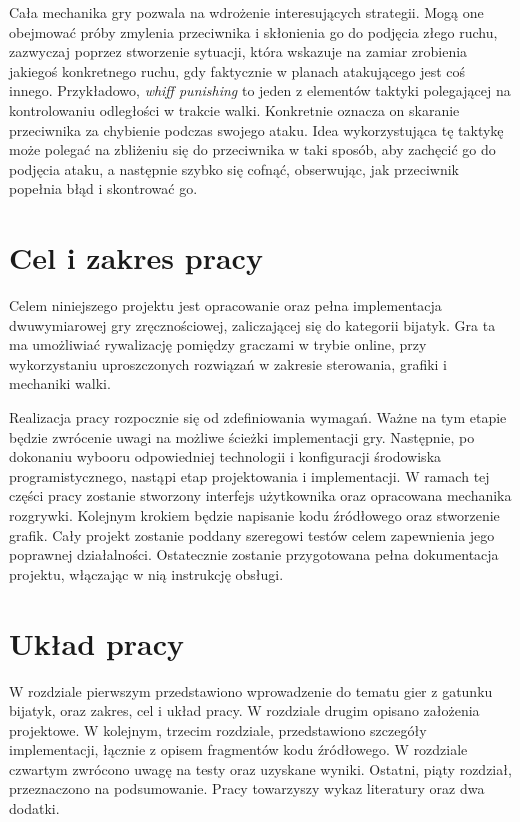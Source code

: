 Cała mechanika gry pozwala na wdrożenie interesujących strategii. Mogą one obejmować próby zmylenia przeciwnika i skłonienia go do podjęcia złego ruchu, zazwyczaj poprzez stworzenie sytuacji, która wskazuje na zamiar zrobienia jakiegoś konkretnego ruchu, gdy faktycznie w planach atakującego jest coś innego. Przykładowo, \emph{whiff punishing} to jeden z elementów taktyki polegającej na kontrolowaniu odległości w trakcie walki. Konkretnie oznacza on skaranie przeciwnika za chybienie podczas swojego ataku. Idea wykorzystująca tę taktykę może polegać na zbliżeniu się do przeciwnika w taki sposób, aby zachęcić go do podjęcia ataku, a następnie szybko się cofnąć, obserwując, jak przeciwnik popełnia błąd i skontrować go. 


\section{Cel i zakres pracy}
Celem niniejszego projektu jest opracowanie oraz pełna implementacja dwuwymiarowej gry zręcznościowej, zaliczającej się do kategorii bijatyk. Gra ta ma umożliwiać rywalizację pomiędzy graczami w trybie online, przy wykorzystaniu uproszczonych rozwiązań w zakresie sterowania, grafiki i mechaniki walki.

Realizacja pracy rozpocznie się od zdefiniowania wymagań. Ważne na tym etapie będzie zwrócenie uwagi na możliwe ścieżki implementacji gry. Następnie, po dokonaniu wybooru odpowiedniej technologii i konfiguracji środowiska programistycznego, nastąpi etap projektowania i implementacji. W ramach tej części pracy zostanie stworzony interfejs użytkownika oraz opracowana mechanika rozgrywki. Kolejnym krokiem będzie napisanie kodu źródłowego oraz stworzenie grafik. Cały projekt zostanie poddany szeregowi testów celem zapewnienia jego poprawnej działalności. Ostatecznie zostanie przygotowana pełna dokumentacja projektu, włączając w nią instrukcję obsługi.

\section{Układ pracy}
W rozdziale pierwszym przedstawiono wprowadzenie do tematu gier z gatunku bijatyk, oraz zakres, cel i układ pracy.
W rozdziale drugim opisano założenia projektowe.
W kolejnym, trzecim rozdziale, przedstawiono szczegóły implementacji, łącznie z opisem fragmentów kodu źródłowego.
W rozdziale czwartym zwrócono uwagę na testy oraz uzyskane wyniki.
Ostatni, piąty rozdział, przeznaczono na podsumowanie.
Pracy towarzyszy wykaz literatury oraz dwa dodatki. 

